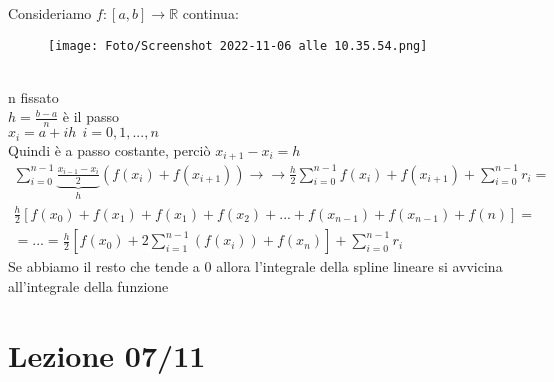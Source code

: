 \documentclass[a4paper, portrait]{book}
\numberwithin{equation}{chapter} %
\begin{document}
Consideriamo $f:[a,b] \rightarrow \mathbb{R}$ continua:
\begin{figure}[h!]
    \centering
    \texttt{[image: Foto/Screenshot 2022-11-06 alle 10.35.54.png]}
    \caption{}
\end{figure}
\\n fissato\\
$h = \frac{b-a}{n}$ è il passo\\
$x_i = a+ih \ \ i = 0,1,...,n$\\
Quindi è a passo costante, perciò $x_{i+1}-x_i = h$
\begin{gather}
    \sum_{i=0}^{n-1}\underbrace{\frac{x_{i-1}-x_i}{2}}_{h}(f(x_i)+f(x_{i+1})) \rightarrow
    \rightarrow \frac{h}{2}\sum_{i=0}^{n-1}f(x_i)+f(x_{i+1}) + \sum_{i=0}^{n-1}r_i =\\
    \frac{h}{2}[f(x_0)+f(x_1)+f(x_1)+f(x_2)+...+ f(x_{n-1})+f(x_{n-1})+f(n)] = \\
    = ... = \frac{h}{2}[f(x_0) + 2\sum_{i=1}^{n-1}(f(x_i)) + f(x_n)] + \sum_{i=0}^{n-1}r_i
\end{gather}
Se abbiamo il resto che tende a 0 allora l'integrale della spline lineare si avvicina all'integrale della funzione
\chapter{Lezione 07/11}
\end{document}
